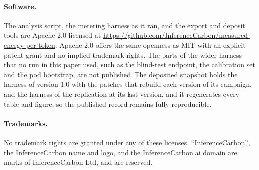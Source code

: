 \documentclass[11pt]{article}
\begin{document}
\paragraph{Software.} The analysis script, the metering harness as it ran, and the export and deposit tools are Apache-2.0-licensed at \url{https://github.com/InferenceCarbon/measured-energy-per-token}: Apache 2.0 offers the same openness as MIT with an explicit patent grant and no implied trademark rights. The parts of the wider harness that no run in this paper used, such as the blind-test endpoint, the calibration set and the pod bootstrap, are not published. The deposited snapshot holds the harness of version 1.0 with the patches that rebuild each version of its campaign, and the harness of the replication at its last version, and it regenerates every table and figure, so the published record remains fully reproducible.

\paragraph{Trademarks.} No trademark rights are granted under any of these licenses. ``InferenceCarbon'', the InferenceCarbon name and logo, and the InferenceCarbon.ai domain are marks of InferenceCarbon Ltd, and are reserved.
\end{document}
